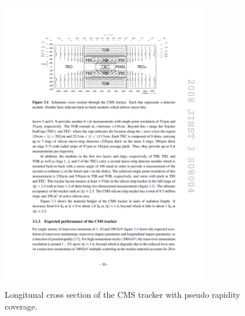 \begin{figure}
\begin{center}
\includegraphics[angle=-0,width=0.8\textwidth]{2_LHC_and_CMS/pics/trkxsec.pdf}
\caption{Longitunal cross section of the CMS tracker with pseudo rapidity coverage. 
\label{fig:tracker}
}
\end{center}
\end{figure}

